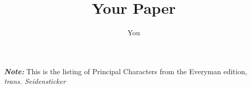 \documentclass{article}
\title{Your Paper}
\author{You}
\begin{document}



\begin{figure}
\end{figure}


\clearpage




\noindent \textbf{\textit{Note:}} This is the listing of Principal Characters from the Everyman edition, \textit{trans. Seidensticker}
\end{document}
